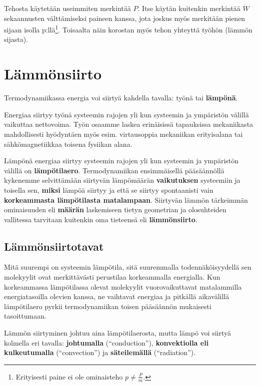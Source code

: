 \documentclass[12pt,a4paper,finnish]{book}
\begin{document}
Tehosta käytetään useimmiten merkintää $P$. Itse käytän kuitenkin merkintää $\dot{W}$ sekaannusten 
välttämiseksi paineen kanssa, jota joskus myös merkitään pienen sijaan isolla p:llä\footnote{
Erityisesti paine ei ole ominaisteho $p \neq \frac{P}{m}$.}. Toisaalta näin 
korostan myös tehon yhteyttä työhön (lämmön sijasta).

\part{Lämmönsiirto} %

Termodynamiikassa energia voi siirtyä kahdella tavalla: työnä tai \textbf{lämpönä}. 

Energiaa siirtyy työnä systeemin rajojen yli kun systeemin ja ympäristön välillä vaikuttaa 
nettovoima. Työn osaamme laskea erinäisissä tapauksissa mekaniikasta mahdollisesti 
hyödyntäen myös esim. virtausoppia mekaniikan erityisalana tai sähkömagnetiikkaa 
toisena fysiikan alana.

Lämpönä energiaa siirtyy systeemin rajojen yli kun systeemin ja ympäristön välillä on 
\textbf{lämpötilaero}. Termodynamiikan ensimmäisellä pääsäännöllä kykenemme selvittämään 
siirtyvän lämpömäärän \textbf{vaikutuksen} systeemiin ja toisella sen, \textbf{miksi} lämpöä 
siirtyy ja että se siirtyy spontaanisti vain \textbf{korkeammasta lämpötilasta matalampaan}. 
Siirtyvän lämmön tärkeimmän ominaisuuden eli \textbf{määrän} laskemiseen tietyn geometrian ja 
olosuhteiden vallitessa tarvitaan kuitenkin oma tieteensä eli \textbf{lämmönsiirto}.

\chapter{Lämmönsiirtotavat}

Mitä suurempi on systeemin lämpötila, sitä suuremmalla todennäköisyydellä sen molekyylit 
ovat merkittävästi perustilaa korkeammalla energialla. Kun korkeammassa lämpötilassa 
olevat molekyylit vuorovaikuttavat matalammilla energiatasoilla olevien kanssa, ne 
vaihtavat energiaa ja pitkällä aikavälillä lämpötilaero pyrkii termodynamiikan 
toisen pääsäännön mukaisesti tasoittumaan.

Lämmön siirtyminen johtuu aina lämpötilaerosta, mutta lämpö voi siirtyä kolmella eri 
tavalla: \textbf{johtumalla} (``conduction''), \textbf{konvektiolla eli kulkeutumalla} 
(``convection'') ja \textbf{säteilemällä} (``radiation'').
\end{document}
